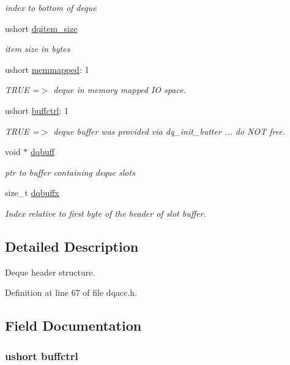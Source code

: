 \begin{DoxyCompactItemize}
\begin{DoxyCompactList}\small\item\em index to bottom of deque \end{DoxyCompactList}\item 
ushort \hyperlink{struct_d_q_h_e_a_d_e_r_a40241a744320a331e0a0c37ecc1a7b8b}{dqitem\-\_\-size}
\begin{DoxyCompactList}\small\item\em item size in bytes \end{DoxyCompactList}\item 
ushort \hyperlink{struct_d_q_h_e_a_d_e_r_a738331e6f1d54405b568a4c032f8c8eb}{memmapped}\-: 1
\begin{DoxyCompactList}\small\item\em T\-R\-U\-E =$>$ deque in memory mapped I\-O space. \end{DoxyCompactList}\item 
ushort \hyperlink{struct_d_q_h_e_a_d_e_r_a9f1a8e591d86f4e9e40c723dbb9f1d34}{buffctrl}\-: 1
\begin{DoxyCompactList}\small\item\em T\-R\-U\-E =$>$ deque buffer was provided via dq\-\_\-init\-\_\-butter ... do N\-O\-T free. \end{DoxyCompactList}\item 
void $\ast$ \hyperlink{struct_d_q_h_e_a_d_e_r_aa14fd3b6ea131b35ec542792afb17003}{dqbuff}
\begin{DoxyCompactList}\small\item\em ptr to buffer containing deque slots \end{DoxyCompactList}\item 
size\-\_\-t \hyperlink{struct_d_q_h_e_a_d_e_r_abd11a78ad177d4e8fb1ef0af8d025782}{dqbuffx}
\begin{DoxyCompactList}\small\item\em Index relative to first byte of the header of slot buffer. \end{DoxyCompactList}\end{DoxyCompactItemize}


\subsection{Detailed Description}
Deque header structure. 

Definition at line 67 of file dqacc.\-h.



\subsection{Field Documentation}
\hypertarget{struct_d_q_h_e_a_d_e_r_a9f1a8e591d86f4e9e40c723dbb9f1d34}{
\subsubsection[{buffctrl}]{\setlength{\rightskip}{0pt plus 5cm}ushort buffctrl}}\label{struct_d_q_h_e_a_d_e_r_a9f1a8e591d86f4e9e40c723dbb9f1d34}



